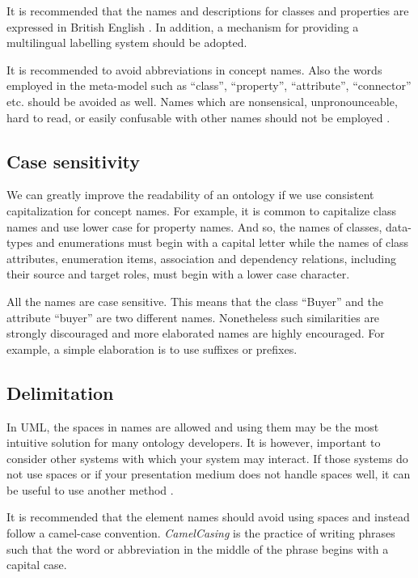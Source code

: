 	It is recommended that the names and descriptions for classes and properties are expressed in British English \cite{d2.01-2017}. In addition, a mechanism for providing a multilingual labelling system should be adopted. 
	
	It is recommended to avoid abbreviations in concept names. Also the words employed in the meta-model such as ``class'', ``property'', ``attribute'', ``connector'' etc. should be avoided as well. Names which are nonsensical, unpronounceable, hard to read, or easily confusable with other names should not be employed \cite{xml1-spec}.

	\subsection{Case sensitivity}	
	\label{sec:casing}
	
	We can greatly improve the readability of an ontology if we use consistent capitalization for concept names. For example, it is common to capitalize class names and use lower case for property names. And so, the names of classes, data-types and enumerations must begin with a capital letter while the names of class attributes, enumeration items, association and dependency relations, including their source and target roles, must begin with a lower case character.
	
	All the names are case sensitive. This means that the class ``Buyer'' and the attribute ``buyer'' are two different names. Nonetheless such similarities are strongly discouraged and more elaborated names are highly encouraged. For example, a simple elaboration is to use suffixes or prefixes. 

	\subsection{Delimitation}
	\label{sec:delimitation}
	
	In UML, the spaces in names are allowed and using them may be the most intuitive solution for many ontology developers. It is however, important to consider other systems with which your system may interact. If those systems do not use spaces or if your presentation medium does not handle spaces well, it can be useful to use another method \cite{noy2001}. 
	
	It is recommended that the element names should avoid using spaces and instead follow a camel-case convention. \textit{CamelCasing} is the practice of writing phrases such that the word or abbreviation in the middle of the phrase begins with a capital case. 
	
